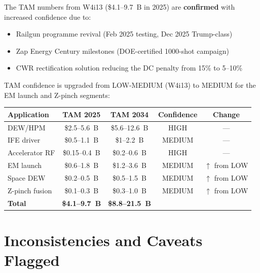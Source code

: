\documentclass[11pt]{article}
\begin{document}
The TAM numbers from W4i13 (\$4.1--9.7~B in 2025) are \textbf{confirmed}
with increased confidence due to:
\begin{itemize}[nosep]
  \item Railgun programme revival (Feb 2025 testing, Dec 2025
    Trump-class)
  \item Zap Energy Century milestones (DOE-certified 1000-shot
    campaign)
  \item CWR rectification solution reducing the DC penalty from
    15\% to 5--10\%
\end{itemize}

TAM confidence is upgraded from LOW-MEDIUM (W4i13) to MEDIUM for
the EM launch and Z-pinch segments:

\begin{center}
\begin{tabular}{lcccc}
\toprule
Application & TAM 2025 & TAM 2034 & Confidence & Change \\
\midrule
DEW/HPM & \$2.5--5.6~B & \$5.6--12.6~B & HIGH & --- \\
IFE driver & \$0.5--1.1~B & \$1--2.2~B & MEDIUM & --- \\
Accelerator RF & \$0.15--0.4~B & \$0.2--0.6~B & HIGH & --- \\
EM launch & \$0.6--1.8~B & \$1.2--3.6~B & MEDIUM & $\uparrow$ from LOW \\
Space DEW & \$0.2--0.5~B & \$0.5--1.5~B & MEDIUM & $\uparrow$ from LOW \\
Z-pinch fusion & \$0.1--0.3~B & \$0.3--1.0~B & MEDIUM & $\uparrow$ from LOW \\
\midrule
\textbf{Total} & \textbf{\$4.1--9.7~B} & \textbf{\$8.8--21.5~B} & & \\
\bottomrule
\end{tabular}
\end{center}

\section{Inconsistencies and Caveats Flagged}
\end{document}
